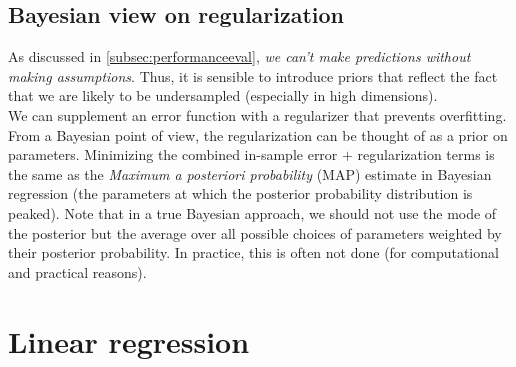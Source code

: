 \subsection{Bayesian view on regularization}
As discussed in \ref{subsec:performanceeval}, \emph{we can't make predictions without making assumptions}. Thus, it is sensible to introduce priors that reflect the fact that we are likely to be undersampled (especially in high dimensions).\\
We can supplement an error function with a regularizer that prevents overfitting. From a Bayesian point of view, the regularization can be thought of as a prior on parameters. Minimizing the combined in-sample error $+$ regularization terms is the same as the \emph{Maximum a posteriori probability} (MAP) estimate in Bayesian regression (the parameters at which the posterior probability distribution is peaked). Note that in a true Bayesian approach, we should not use the mode of the posterior but the average over all possible choices of parameters weighted by their posterior probability. In practice, this is often not done (for computational and practical reasons).
\section{Linear regression}

